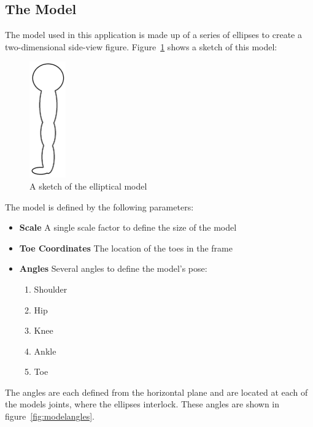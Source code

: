 \subsection{The Model}
\label{subsec:model}

The model used in this application is made up of a series of ellipses to create a two-dimensional side-view figure. Figure~\ref{fig:modelellipses} shows a sketch of this model:

\begin{figure}[H]
    \centering
	\includegraphics[height=5cm]{algorithm/images/model}
\caption{A sketch of the elliptical model}
\label{fig:modelellipses}
\end{figure}

The model is defined by the following parameters:

\begin{itemize}
	\item \textbf{Scale} A single scale factor to define the size of the model
	\item \textbf{Toe Coordinates} The location of the toes in the frame
	\item \textbf{Angles} Several angles to define the model's pose:
		\begin{enumerate}
			\item Shoulder
			\item Hip
			\item Knee
			\item Ankle
			\item Toe
		\end{enumerate}
\end{itemize}

The angles are each defined from the horizontal plane and are located at each of the models joints, where the ellipses interlock. These angles are shown in figure~\ref{fig:modelangles}.

